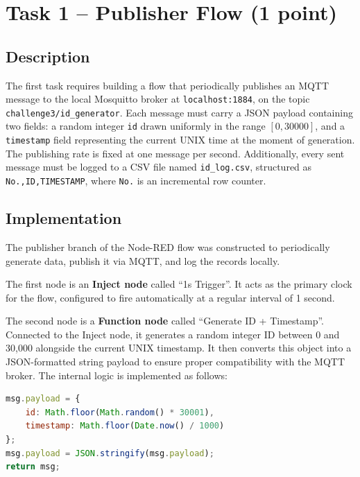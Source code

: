\documentclass[a4paper,11pt]{article}
\begin{document}
\section{Task 1 -- Publisher Flow (1 point)}

\subsection{Description}

The first task requires building a flow that periodically publishes an MQTT message to the local Mosquitto broker at \texttt{localhost:1884}, on the topic \texttt{challenge3/id\_generator}. Each message must carry a JSON payload containing two fields: a random integer \texttt{id} drawn uniformly in the range $[0, 30000]$, and a \texttt{timestamp} field representing the current UNIX time at the moment of generation. The publishing rate is fixed at one message per second. Additionally, every sent message must be logged to a CSV file named \texttt{id\_log.csv}, structured as \texttt{No.,ID,TIMESTAMP}, where \texttt{No.} is an incremental row counter.

\subsection{Implementation}

The publisher branch of the Node-RED flow was constructed to periodically generate data, publish it via MQTT, and log the records locally.

The first node is an \textbf{Inject node} called ``1s Trigger''. It acts as the primary clock for the flow, configured to fire automatically at a regular interval of 1 second.

The second node is a \textbf{Function node} called ``Generate ID + Timestamp''. Connected to the Inject node, it generates a random integer ID between 0 and 30,000 alongside the current UNIX timestamp. It then converts this object into a JSON-formatted string payload to ensure proper compatibility with the MQTT broker. The internal logic is implemented as follows:

\begin{lstlisting}[language=JavaScript, caption={Generate ID + Timestamp logic}]
msg.payload = {
    id: Math.floor(Math.random() * 30001),
    timestamp: Math.floor(Date.now() / 1000)
};
msg.payload = JSON.stringify(msg.payload);
return msg;
\end{lstlisting}
\end{document}
